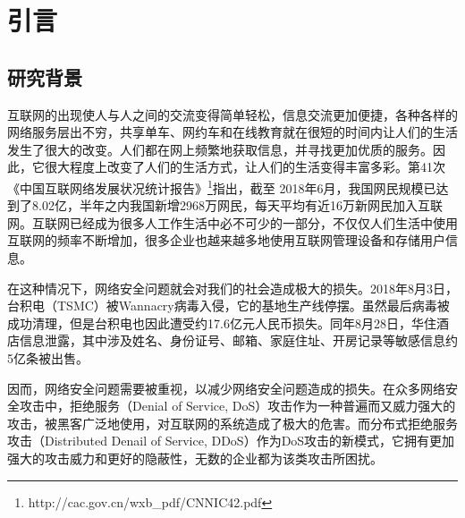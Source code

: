 \chapter{引言}
\label{cha:intro}

\section{研究背景}
\label{sec:background}

互联网的出现使人与人之间的交流变得简单轻松，信息交流更加便捷，各种各样的网络服务层出不穷，共享单车、网约车和在线教育就在很短的时间内让人们的生活发生了很大的改变。人们都在网上频繁地获取信息，并寻找更加优质的服务。因此，它很大程度上改变了人们的生活方式，让人们的生活变得丰富多彩。第41次《中国互联网络发展状况统计报告》\footnote{http://cac.gov.cn/wxb\_pdf/CNNIC42.pdf}指出，截至 2018年6月，我国网民规模已达到了8.02亿，半年之内我国新增2968万网民，每天平均有近16万新网民加入互联网。互联网已经成为很多人工作生活中必不可少的一部分，不仅仅人们生活中使用互联网的频率不断增加，很多企业也越来越多地使用互联网管理设备和存储用户信息。

在这种情况下，网络安全问题就会对我们的社会造成极大的损失。2018年8月3日，台积电（TSMC）被Wannacry病毒入侵，它的基地生产线停摆。虽然最后病毒被成功清理，但是台积电也因此遭受约17.6亿元人民币损失。同年8月28日，华住酒店信息泄露，其中涉及姓名、身份证号、邮箱、家庭住址、开房记录等敏感信息约5亿条被出售。

因而，网络安全问题需要被重视，以减少网络安全问题造成的损失。在众多网络安全攻击中，拒绝服务（Denial of Service, DoS）攻击作为一种普遍而又威力强大的攻击，被黑客广泛地使用，对互联网的系统造成了极大的危害。而分布式拒绝服务攻击（Distributed Denail of Service, DDoS）作为DoS攻击的新模式，它拥有更加强大的攻击威力和更好的隐蔽性，无数的企业都为该类攻击所困扰。


